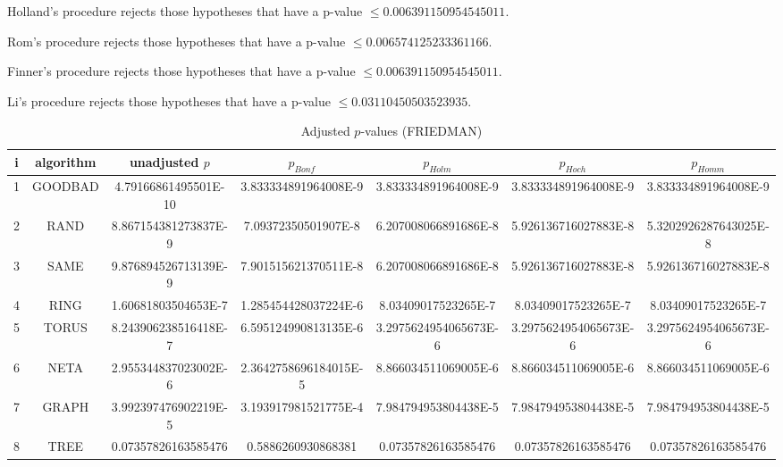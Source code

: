 \documentclass[a4paper,10pt]{article}
\begin{document}
\begin{landscape}
Holland's procedure rejects those hypotheses that have a p-value $\le0.006391150954545011$.


Rom's procedure rejects those hypotheses that have a p-value $\le0.006574125233361166$.


Finner's procedure rejects those hypotheses that have a p-value $\le0.006391150954545011$.


Li's procedure rejects those hypotheses that have a p-value $\le0.03110450503523935$.



\newpage

\begin{table}[!htp]
\centering\scriptsize
\caption{Adjusted $p$-values (FRIEDMAN)}
\begin{tabular}{ccccccc}
i&algorithm&unadjusted $p$&$p_{Bonf}$&$p_{Holm}$&$p_{Hoch}$&$p_{Homm}$\\
\hline
1& GOODBAD&4.79166861495501E-10&3.833334891964008E-9&3.833334891964008E-9&3.833334891964008E-9&3.833334891964008E-9\\
2& RAND&8.867154381273837E-9&7.09372350501907E-8&6.207008066891686E-8&5.926136716027883E-8&5.3202926287643025E-8\\
3& SAME&9.876894526713139E-9&7.901515621370511E-8&6.207008066891686E-8&5.926136716027883E-8&5.926136716027883E-8\\
4& RING&1.60681803504653E-7&1.285454428037224E-6&8.03409017523265E-7&8.03409017523265E-7&8.03409017523265E-7\\
5& TORUS&8.243906238516418E-7&6.595124990813135E-6&3.2975624954065673E-6&3.2975624954065673E-6&3.2975624954065673E-6\\
6& NETA&2.955344837023002E-6&2.3642758696184015E-5&8.866034511069005E-6&8.866034511069005E-6&8.866034511069005E-6\\
7& GRAPH&3.992397476902219E-5&3.193917981521775E-4&7.984794953804438E-5&7.984794953804438E-5&7.984794953804438E-5\\
8& TREE&0.07357826163585476&0.5886260930868381&0.07357826163585476&0.07357826163585476&0.07357826163585476\\
\hline
\end{tabular}
\end{table}


\end{landscape}
\end{document}
